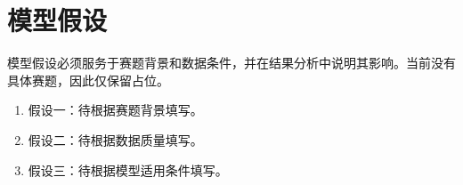 \section{模型假设}

模型假设必须服务于赛题背景和数据条件，并在结果分析中说明其影响。当前没有具体赛题，因此仅保留占位。

\begin{enumerate}
  \item 假设一：待根据赛题背景填写。
  \item 假设二：待根据数据质量填写。
  \item 假设三：待根据模型适用条件填写。
\end{enumerate}
